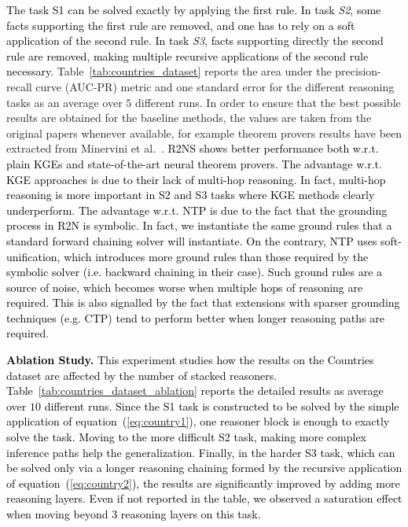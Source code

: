 \documentclass[journal]{IEEEtran}
\newcommand{\ar}[1]{\textcolor{black}{#1}}
\begin{document}
\ar{The task S1 can be solved exactly by applying the first rule. In task \textit{S2}, some facts supporting the first rule are removed, and one has to rely on a soft application of the second rule. In task \textit{S3}, facts supporting directly the second rule are removed, making multiple recursive applications of the second rule necessary.} 
Table~\ref{tab:countries_dataset} reports the area under the precision-recall curve (AUC-PR) metric and one standard error for the different reasoning tasks as an average over $5$ different runs.
In order to ensure that the best possible results are obtained for the baseline methods, the values are taken from the original papers whenever available, for example theorem provers results have been extracted from Minervini et al.~\cite{minervini2020learning}. \ar{R2NS shows better performance both w.r.t. plain KGEs and state-of-the-art neural theorem provers. The advantage w.r.t. KGE approaches is due to their lack of multi-hop reasoning. In fact, multi-hop reasoning is more important in S2 and S3 tasks where KGE methods clearly underperform. The advantage w.r.t. NTP is due to the fact that the grounding process in R2N is symbolic. In fact, we instantiate the same ground rules that a standard forward chaining solver will instantiate. On the contrary, NTP uses soft-unification, which introduces more ground rules than those required by the symbolic solver (i.e. backward chaining in their case). Such ground rules are a source of noise, which becomes worse when multiple hops of reasoning are required. This is also signalled by the fact that extensions with sparser grounding techniques (e.g. CTP) tend to perform better when longer reasoning paths are required}.

\ar{
{\bf Ablation Study. } This experiment studies how the results on the Countries dataset are affected by the number of stacked reasoners. Table~\ref{tab:countries_dataset_ablation} reports the detailed results as average over $10$ different runs. Since the S1 task is constructed to be solved by the simple application of equation~(\ref{eq:country1}), one reasoner block is enough to exactly solve the task. Moving to the more difficult S2 task, making more complex inference paths help the generalization. Finally, in the harder S3 task, which can be solved only via a longer reasoning chaining formed by the recursive application of equation~(\ref{eq:country2}), the results are significantly improved by adding more reasoning layers. Even if not reported in the table, we observed a saturation effect when moving beyond $3$ reasoning layers on this task.
}
\end{document}
